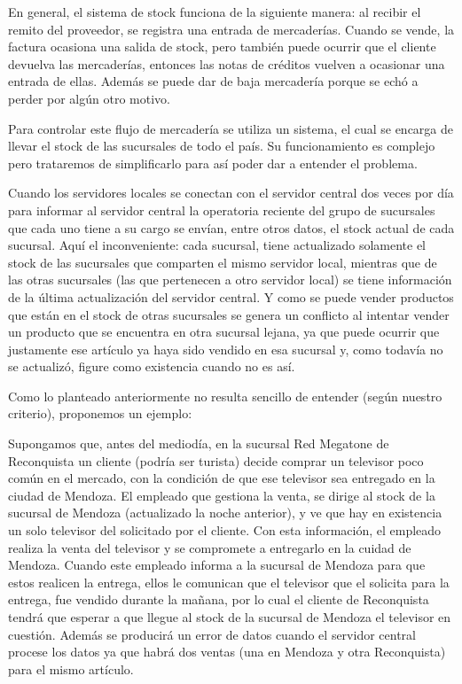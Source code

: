 En general, el sistema de stock funciona de la siguiente manera: al recibir el
remito del proveedor, se registra una entrada de mercaderías. Cuando se vende,
la factura ocasiona una salida de stock, pero también puede ocurrir que el
cliente devuelva las mercaderías, entonces las notas de créditos vuelven a
ocasionar una entrada de ellas. Además se puede dar de baja mercadería porque
se echó a perder por algún otro motivo.

Para controlar este flujo de mercadería se utiliza un sistema, el cual se
encarga de llevar el stock de las sucursales de todo el país. Su funcionamiento
es complejo pero trataremos de simplificarlo para así poder dar a entender el
problema. 

Cuando los servidores locales se conectan con el servidor central dos veces por
día para informar al servidor central la operatoria reciente del grupo de
sucursales que cada uno tiene a su cargo se envían, entre otros datos, el stock
actual de cada sucursal. Aquí el inconveniente: cada sucursal, tiene
actualizado solamente el stock de las sucursales que comparten el mismo
servidor local, mientras que de las otras sucursales (las que pertenecen a otro
servidor local) se tiene información de la última actualización del servidor
central. Y como se puede vender productos que están en el stock de otras
sucursales se genera un conflicto al intentar vender un producto que se
encuentra en otra sucursal lejana, ya que puede ocurrir que justamente ese
artículo ya haya sido vendido en esa sucursal y, como todavía no se actualizó,
figure como existencia cuando no es así.

Como lo planteado anteriormente no resulta sencillo de entender (según nuestro
criterio), proponemos un ejemplo:

Supongamos que, antes del mediodía, en la sucursal Red Megatone de Reconquista
un cliente (podría ser turista) decide comprar un televisor poco común en el
mercado, con la condición de que ese televisor sea entregado en la ciudad de
Mendoza. El empleado que gestiona la venta, se dirige al stock de la sucursal
de Mendoza (actualizado la noche anterior), y ve que hay en existencia un solo
televisor del solicitado por el cliente. Con esta información, el empleado
realiza la venta del televisor y se compromete a entregarlo en la cuidad de
Mendoza. Cuando este empleado informa a la sucursal de Mendoza para que estos
realicen la entrega, ellos le comunican que el televisor que el solicita para
la entrega, fue vendido durante la mañana, por lo cual el cliente de
Reconquista tendrá que esperar a que llegue al stock de la sucursal de Mendoza
el televisor en cuestión. Además se producirá un error de datos cuando el
servidor central procese los datos ya que habrá dos ventas (una en Mendoza y
otra Reconquista) para el mismo artículo.

